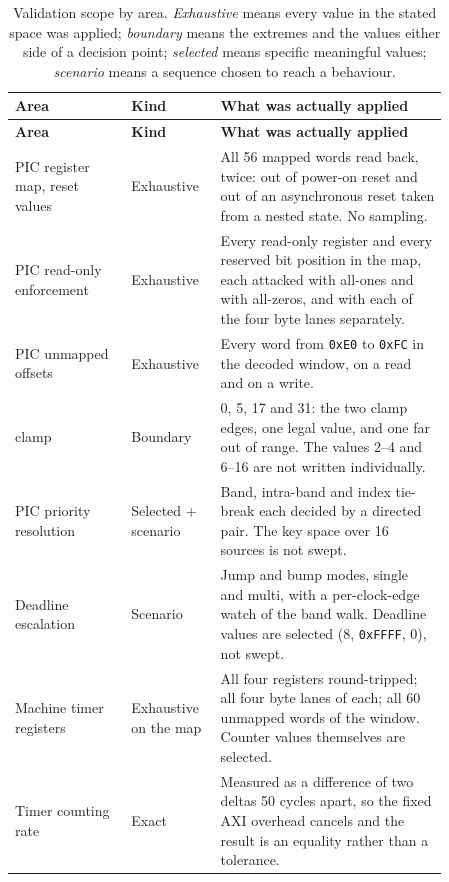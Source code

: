 {\small
\begin{longtable}{@{}L{0.24\linewidth}L{0.15\linewidth}L{0.47\linewidth}@{}}
\caption{Validation scope by area. \emph{Exhaustive} means every value in the
stated space was applied; \emph{boundary} means the extremes and the values
either side of a decision point; \emph{selected} means specific meaningful
values; \emph{scenario} means a sequence chosen to reach a behaviour.}
\label{tab:valscope}\\
\toprule
\textbf{Area} & \textbf{Kind} & \textbf{What was actually applied} \\
\midrule
\endfirsthead
\toprule
\textbf{Area} & \textbf{Kind} & \textbf{What was actually applied} \\
\midrule
\endhead
\bottomrule
\endfoot
\bottomrule
\endlastfoot
PIC register map, reset values & Exhaustive &
  All 56 mapped words read back, twice: out of power-on reset and out of an
  asynchronous reset taken from a nested state. No sampling. \\
PIC read-only enforcement & Exhaustive &
  Every read-only register and every reserved bit position in the map, each
  attacked with all-ones and with all-zeros, and with each of the four byte
  lanes separately. \\
PIC unmapped offsets & Exhaustive &
  Every word from \texttt{0xE0} to \texttt{0xFC} in the decoded window, on a
  read and on a write. \\
 clamp & Boundary &
  0, 5, 17 and 31: the two clamp edges, one legal value, and one far out of
  range. The values 2--4 and 6--16 are not written individually. \\
PIC priority resolution & Selected + scenario &
  Band, intra-band and index tie-break each decided by a directed pair. The
  key space over 16 sources is not swept. \\
Deadline escalation & Scenario &
  Jump and bump modes, single and multi, with a per-clock-edge watch of the
  band walk. Deadline values are selected (8, \texttt{0xFFFF}, 0), not swept. \\
\midrule
Machine timer registers & Exhaustive on the map &
  All four registers round-tripped; all four byte lanes of each; all 60
  unmapped words of the window. Counter values themselves are selected. \\
Timer counting rate & Exact &
  Measured as a difference of two deltas 50 cycles apart, so the fixed AXI
  overhead cancels and the result is an equality rather than a tolerance. \\

\end{longtable}}
